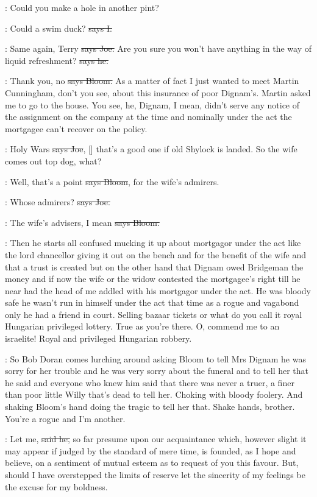 \joe:
Could you make a hole in another pint?

:
Could a swim duck?
\sout{says I.}

\joe:
Same again,
Terry
\sout{says Joe.}
Are you sure you won't have anything in the
way of liquid refreshment?
\sout{says he.}

\Bloom:
Thank you,
no
\sout{says Bloom.}
As a matter of fact I just wanted to meet
Martin Cunningham,
don't you see,
about this insurance of poor Dignam's.
Martin asked me to go to the house.
You see,
he,
Dignam,
I mean,
didn't
serve any notice of the assignment on the company at the time and
nominally under the act the mortgagee can't recover on the policy.

\joe:
Holy Wars
\sout{says Joe},
[] that's a good one if old Shylock is
landed.
So the wife comes out top dog,
what?

\Bloom:
Well,
that's a point
\sout{says Bloom},
for the wife's admirers.

\joe:
Whose admirers?
\sout{says Joe.}

\Bloom:
The wife's advisers,
I mean
\sout{says Bloom.}

\Nq:
Then he starts all confused
mucking it up about mortgagor under the act
like the lord chancellor giving it out on the bench and for the benefit of
the wife and that a trust is created but on the other hand that Dignam
owed Bridgeman the money and if now the wife or the widow contested the
mortgagee's right till he near had the head of me addled with his
mortgagor under the act.
He was bloody safe he wasn't run in himself under
the act that time as a rogue and vagabond only he had a friend in court.
Selling bazaar tickets or what do you call it royal Hungarian privileged
lottery.
True as you're there.
O,
commend me to an israelite!
Royal and
privileged Hungarian robbery.

\Nq:
So Bob Doran comes lurching around
asking Bloom to tell Mrs
Dignam he was sorry for her trouble and he was very sorry about the
funeral and to tell her that he said and everyone who knew him said that
there was never a truer,
a finer than poor little Willy that's dead to tell
her.
Choking with bloody foolery.
And shaking Bloom's hand doing the
tragic to tell her that.
Shake hands,
brother.
You're a rogue and I'm
another.

\doran:
Let me,
\sout{said he,}
so far presume upon our acquaintance which,
however
slight it may appear if judged by the standard of mere time,
is founded,
as I hope and believe,
on a sentiment of mutual esteem as to request of
you this favour.
But,
should I have overstepped the limits of reserve
let the sincerity of my feelings
be the excuse for my boldness.

